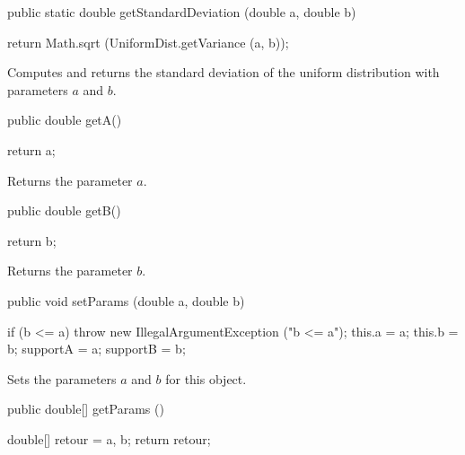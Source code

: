 \begin{htmlonly}
\end{htmlonly}
\begin{code}

   public static double getStandardDeviation (double a, double b)\begin{hide} {
      return Math.sqrt (UniformDist.getVariance (a, b));
   }\end{hide}
\end{code}
\begin{tabb}  Computes and returns the standard deviation
   of the uniform distribution with parameters $a$ and $b$.
\end{tabb}
\begin{htmlonly}
\end{htmlonly}
\begin{code}

   public double getA()\begin{hide} {
      return a;
   }\end{hide}
\end{code}
  \begin{tabb}
  Returns the parameter $a$.
 \end{tabb}
\begin{code}

   public double getB()\begin{hide} {
      return b;
   }
\end{hide}
\end{code}
  \begin{tabb}
  Returns the parameter $b$.
 \end{tabb}
\begin{code}

   public void setParams (double a, double b)\begin{hide} {
      if (b <= a)
         throw new IllegalArgumentException ("b <= a");
      this.a = a;
      this.b = b;
      supportA = a;
      supportB = b;
   }\end{hide}
\end{code}
  \begin{tabb}
  Sets the parameters $a$ and $b$ for this object.
 \end{tabb}
\begin{code}

   public double[] getParams ()\begin{hide} {
      double[] retour = {a, b};
      return retour;
   }\end{hide}
\end{code}
